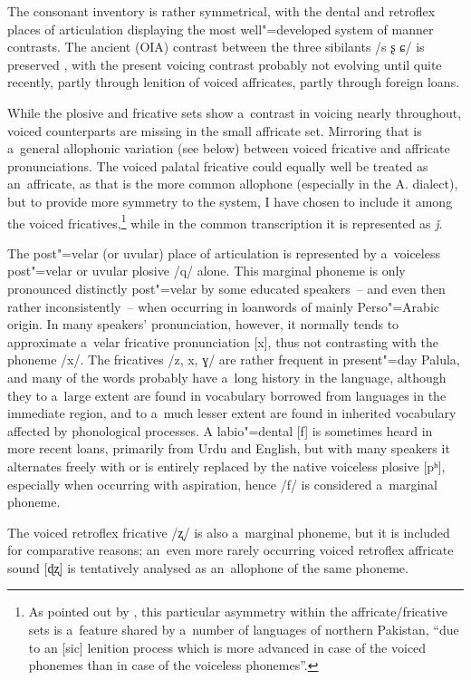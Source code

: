 The consonant inventory is rather symmetrical, with the dental and retroflex places of articulation displaying the most well"=developed system of manner contrasts. The ancient (OIA) contrast between the three sibilants /s ʂ ɕ/ is preserved \citep[442]{cardona1987}, with the present voicing contrast probably not evolving until quite recently, partly through lenition of voiced affricates, partly through foreign loans. 

While the plosive and fricative sets show a~contrast in voicing nearly throughout, voiced counterparts are missing in the small affricate set. Mirroring that is a~general allophonic variation (see below) between voiced fricative and affricate pronunciations. The voiced palatal fricative could equally well be treated as an~affricate, as that is the more common allophone (especially in the A. dialect), but to provide more symmetry to the system, I have chosen to include it among the voiced fricatives,\footnote{As pointed out by \citet[34]{zoller2005}, this particular asymmetry within the affricate/fricative sets is a~feature shared by a~number of languages of northern Pakistan, ``due to an [sic] lenition process which is more advanced in case of the voiced phonemes than in case of the voiceless phonemes''.} while in the common transcription it is represented as \textit{ǰ}.


The post"=velar (or uvular) place of articulation is represented by a~voiceless post"=velar or uvular plosive /q/ alone. This marginal phoneme is only pronounced distinctly post"=velar by some educated speakers~-- and even then rather inconsistently~-- when occurring in loanwords of mainly Perso"=Arabic origin. In many speakers' pronunciation, however, it normally tends to approximate a~velar fricative pronunciation [x], thus not contrasting with the phoneme /x/. The fricatives /z, x, ɣ/ are rather frequent in present"=day Palula, and many of the words probably have a~long history in the language, although they to a~large extent are found in vocabulary borrowed from languages in the immediate region, and to a~much lesser extent are found in inherited vocabulary affected by phonological processes. A labio"=dental [f] is sometimes heard in more recent loans, primarily from Urdu and English, but with many speakers it alternates freely with or is entirely replaced by the native voiceless plosive [pʰ], especially when occurring with aspiration, hence /f/ is considered a~marginal phoneme. 


The voiced retroflex fricative /ʐ/ is also a~marginal phoneme, but it is included for comparative reasons; an~even more rarely occurring voiced retroflex affricate sound [ɖʐ] is tentatively analysed as an~allophone of the same phoneme. 



